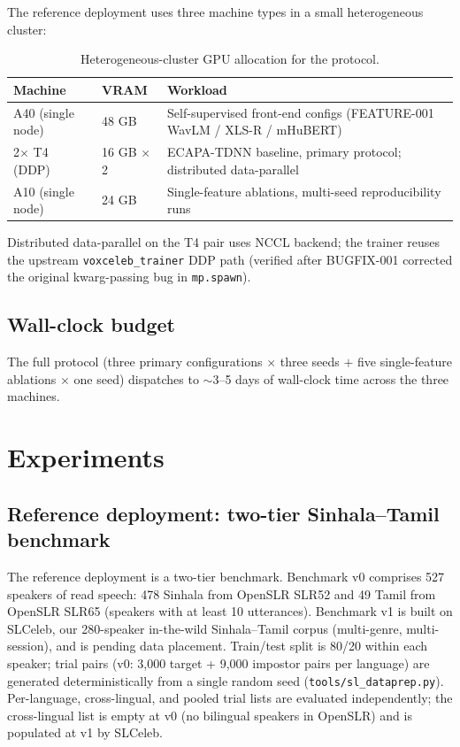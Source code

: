 \documentclass[11pt,a4paper]{article}
\begin{document}
The reference deployment uses three machine types in a small
heterogeneous cluster:

\begin{table}[t]
\centering
\caption{Heterogeneous-cluster GPU allocation for the protocol.}
\label{tab:cluster}
\begin{tabularx}{\linewidth}{lXX}
\toprule
\textbf{Machine} & \textbf{VRAM} & \textbf{Workload} \\
\midrule
A40 (single node)    & 48 GB        & Self-supervised front-end configs (FEATURE-001 WavLM / XLS-R / mHuBERT) \\
2$\times$ T4 (DDP)   & 16 GB $\times$ 2 & ECAPA-TDNN baseline, primary protocol; distributed data-parallel \\
A10 (single node)    & 24 GB        & Single-feature ablations, multi-seed reproducibility runs \\
\bottomrule
\end{tabularx}
\end{table}

Distributed data-parallel on the T4 pair uses NCCL backend; the
trainer reuses the upstream \texttt{voxceleb\_trainer} DDP path
(verified after BUGFIX-001 corrected the original kwarg-passing bug
in \texttt{mp.spawn}).

\subsection{Wall-clock budget}
\label{sec:deploy:budget}

The full protocol (three primary configurations $\times$ three seeds
$+$ five single-feature ablations $\times$ one seed) dispatches to
$\sim$3--5 days of wall-clock time across the three machines.

\section{Experiments}
\label{sec:experiments}

\subsection{Reference deployment: two-tier Sinhala--Tamil benchmark}
\label{sec:exp:corpus}

The reference deployment is a two-tier benchmark. Benchmark v0
comprises 527 speakers of read speech: 478 Sinhala from OpenSLR SLR52
and 49 Tamil from OpenSLR SLR65 (speakers with at least 10
utterances). Benchmark v1 is built on SLCeleb, our 280-speaker
in-the-wild Sinhala--Tamil corpus (multi-genre, multi-session), and is
pending data placement. Train/test split is 80/20 within each speaker;
trial pairs (v0: 3{,}000 target + 9{,}000 impostor pairs per language)
are generated deterministically from a single random seed
(\texttt{tools/sl\_dataprep.py}). Per-language, cross-lingual, and
pooled trial lists are evaluated independently; the cross-lingual list
is empty at v0 (no bilingual speakers in OpenSLR) and is populated at
v1 by SLCeleb.
\end{document}
